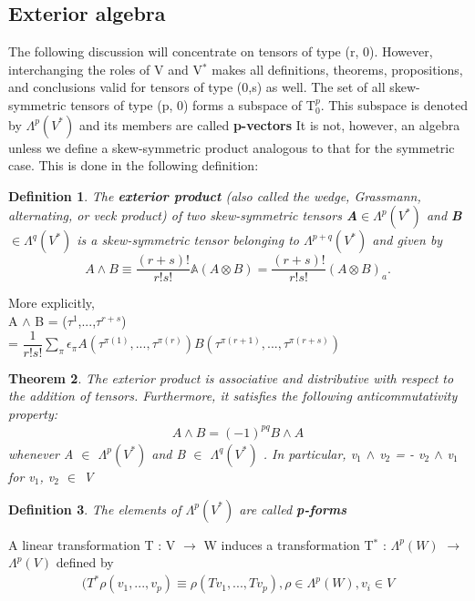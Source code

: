 \documentclass[12pt,a4paper]{article}
\newtheorem{thm}{Theorem}
\newtheorem{defn}[thm]{Definition}
\begin{document}
\subsection{Exterior algebra}
The following discussion will concentrate on tensors of type (r, 0). However, interchanging the roles of V and V$^*$ makes all definitions, theorems,
propositions, and conclusions valid for tensors of type (0,s) as well. The set of all skew-symmetric tensors of type (p, 0) forms a subspace of T$^{p}_{0}$. This subspace is denoted by $\Lambda^{p}  (V^*)$ and its members are called \textbf{p-vectors} It is not, however, an algebra unless we define a skew-symmetric
product analogous to that for the symmetric case. This is done in the following definition:
\begin{defn}
The \textbf{exterior product} (also called the wedge, Grassmann, alternating, or veck product) of two skew-symmetric tensors \textbf{A}$\in\Lambda^{p}(V^*)$ and  \textbf{B}$\in\Lambda^{q}(V^*)$ is a skew-symmetric tensor belonging to $\Lambda^{p+q}(V^*)$ and given by
\begin{equation}
A \wedge B \equiv \dfrac{(r+s)!}{r!s!} \mathbb{A} (A \otimes B ) =\dfrac{(r+s)!}{r!s!}(A \otimes B ) _{a}.
\end{equation}
\end{defn}

More explicitly,\\
A $\wedge$ B = ($\tau^1$,...,$\tau^{r+s}$)\\	
= $\dfrac{1}{r!s!}\sum_{\pi}\epsilon_{\pi} A (\tau^{\pi(1)},...,\tau^{\pi(r)})B (\tau^{\pi(r+1)},...,\tau^{\pi(r+s)})$

\begin{thm}
The exterior product is associative and distributive
with respect to the addition of tensors. Furthermore, it satisfies the
following anticommutativity property:
\begin{eqnarray*}
A \wedge B = (-1)^{pq}B\wedge A
\end{eqnarray*}
whenever A $\in$ $\Lambda^{p} (V^*)$ and B $\in$ $\Lambda^{q} (V^*)$ .  In particular, v$_1$ $\wedge$ v$_2$ =
   - v$_2$ $\wedge$ v$_1$ for v$_1$, v$_2$ $\in$ V
\end{thm}
\begin{defn}
The elements of $\Lambda^{p} (V^*)$ are called \textbf{p-forms} 
\end{defn}
A linear transformation T : V $\to$ W induces a transformation T$^*$ : $\Lambda^{p} (W)$  $\to$ $\Lambda^{p} (V)$ defined by
\begin{eqnarray*}
(T^{*} \rho (v_1,...,v_p) \equiv \rho (T v_1,...,T v_p) , \rho \in \Lambda^{p}(W), v_i \in V
\end{eqnarray*}
\end{document}
